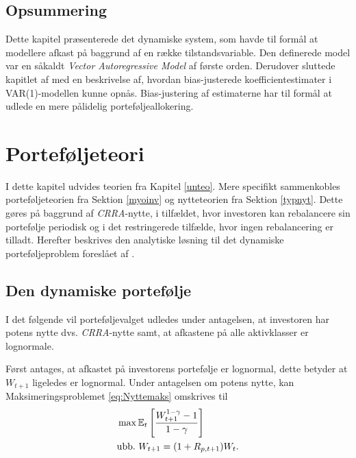 \documentclass[
  a4paper,
  oneside]{memoir}
\begin{document}
\hypertarget{opsummering}{%
\section{Opsummering}\label{opsummering}}

Dette kapitel præsenterede det dynamiske system, som havde til formål at modellere afkast på baggrund af en række tilstandsvariable. Den definerede model var en såkaldt \emph{Vector Autoregressive Model} af første orden. Derudover sluttede kapitlet af med en beskrivelse af, hvordan bias-justerede koefficientestimater i VAR(1)-modellen kunne opnås. Bias-justering af estimaterne har til formål at udlede en mere pålidelig porteføljeallokering.

\hypertarget{porteteori}{%
\chapter{Porteføljeteori}\label{porteteori}}

I dette kapitel udvides teorien fra Kapitel \ref{unteo}. Mere specifikt sammenkobles porteføljeteorien fra Sektion \ref{myoinv} og nytteteorien fra Sektion \ref{typnyt}. Dette gøres på baggrund af \emph{CRRA}-nytte, i tilfældet, hvor investoren kan rebalancere sin portefølje periodisk og i det restringerede tilfælde, hvor ingen rebalancering er tilladt. Herefter beskrives den analytiske løsning til det dynamiske porteføljeproblem foreslået af \citep{JurVic2011}.

\hypertarget{crraportef}{%
\section{Den dynamiske portefølje}\label{crraportef}}

I det følgende vil porteføljevalget udledes under antagelsen, at investoren har potens nytte dvs. \emph{CRRA}-nytte samt, at afkastene på alle aktivklasser er lognormale.

Først antages, at afkastet på investorens portefølje er lognormal, dette betyder at \(W_{t+1}\) ligeledes er lognormal. Under antagelsen om potens nytte, kan Maksimeringsproblemet \eqref{eq:Nyttemaks} omskrives til
\begin{align}
&\max\mathbb{E}_t\left[\frac{W_{t+1}^{1-\gamma}-1}{1-\gamma}\right] \label{eq:CRRAmaks}\\
&\text{ubb.}\,\,W_{t+1}=(1+R_{p,t+1})W_t.\notag
\end{align}
\end{document}
